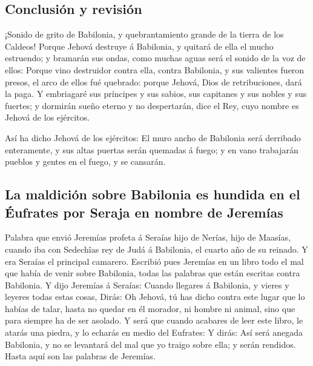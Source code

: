 \hypertarget{conclusiuxf3n-y-revisiuxf3n}{%
\subsection{Conclusión y revisión}\label{conclusiuxf3n-y-revisiuxf3n}}

 ¡Sonido de grito de Babilonia, y quebrantamiento grande
de la tierra de los Caldeos!  Porque Jehová destruye á
Babilonia, y quitará de ella el mucho estruendo; y bramarán sus ondas,
como muchas aguas será el sonido de la voz de ellos: 
Porque vino destruidor contra ella, contra Babilonia, y sus valientes
fueron presos, el arco de ellos fué quebrado: porque Jehová, Dios de
retribuciones, dará la paga.  Y embriagaré sus príncipes
y sus sabios, sus capitanes y sus nobles y sus fuertes; y dormirán sueño
eterno y no despertarán, dice el Rey, cuyo nombre es Jehová de los
ejércitos.

 Así ha dicho Jehová de los ejércitos: El muro ancho de
Babilonia será derribado enteramente, y sus altas puertas serán quemadas
á fuego; y en vano trabajarán pueblos y gentes en el fuego, y se
cansarán.

\hypertarget{la-maldiciuxf3n-sobre-babilonia-es-hundida-en-el-uxe9ufrates-por-seraja-en-nombre-de-jeremuxedas}{%
\subsection{La maldición sobre Babilonia es hundida en el Éufrates por
Seraja en nombre de
Jeremías}\label{la-maldiciuxf3n-sobre-babilonia-es-hundida-en-el-uxe9ufrates-por-seraja-en-nombre-de-jeremuxedas}}

 Palabra que envió Jeremías profeta á Seraías hijo de
Nerías, hijo de Maasías, cuando iba con Sedechîas rey de Judá á
Babilonia, el cuarto año de su reinado. Y era Seraías el principal
camarero.  Escribió pues Jeremías en un libro todo el mal
que había de venir sobre Babilonia, todas las palabras que están
escritas contra Babilonia.  Y dijo Jeremías á Seraías:
Cuando llegares á Babilonia, y vieres y leyeres todas estas cosas,
 Dirás: Oh Jehová, tú has dicho contra este lugar que lo
habías de talar, hasta no quedar en él morador, ni hombre ni animal,
sino que para siempre ha de ser asolado.  Y será que
cuando acabares de leer este libro, le atarás una piedra, y lo echarás
en medio del Eufrates:  Y dirás: Así será anegada
Babilonia, y no se levantará del mal que yo traigo sobre ella; y serán
rendidos. Hasta aquí son las palabras de Jeremías.

